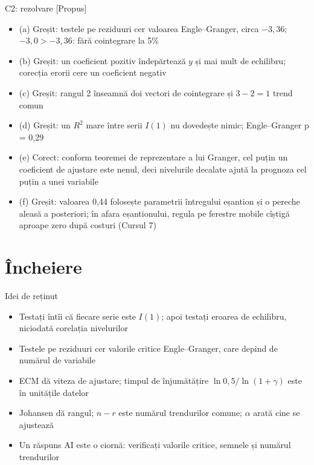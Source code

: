 \ifsolutions
\begin{frame}{C2: rezolvare [Propus]}
\itemsize{\scriptsize}
\begin{itemize}
    \item (a) Greșit: testele pe reziduuri cer valoarea Engle--Granger, circa $-3{,}36$; $-3{,}0 > -3{,}36$: fără cointegrare la 5\%
    \item (b) Greșit: un coeficient pozitiv îndepărtează $y$ și mai mult de echilibru; corecția erorii cere un coeficient negativ
    \item (c) Greșit: rangul 2 înseamnă doi vectori de cointegrare și $3 - 2 = 1$ trend comun
    \item (d) Greșit: un $R^2$ mare între serii $I(1)$ nu dovedește nimic; Engle--Granger p = 0{,}29
    \item (e) Corect: conform teoremei de reprezentare a lui Granger, cel puțin un coeficient de ajustare este nenul, deci nivelurile decalate ajută la prognoza cel puțin a unei variabile
    \item (f) Greșit: valoarea 0,44 folosește parametrii întregului eșantion și o pereche aleasă a posteriori; în afara eșantionului, regula pe ferestre mobile cîștigă aproape zero după costuri (Cursul 7)
\end{itemize}
\end{frame}
\fi


\section{Încheiere}

\begin{frame}{Idei de reținut}
\itemsize{\small}
\begin{itemize}
    \item Testați întîi că fiecare serie este $I(1)$; apoi testați eroarea de echilibru, niciodată corelația nivelurilor
    \item Testele pe reziduuri cer valorile critice Engle--Granger, care depind de numărul de variabile
    \item ECM dă viteza de ajustare; timpul de înjumătățire $\ln 0{,}5/\ln(1 + \gamma)$ este în unitățile datelor
    \item Johansen dă rangul; $n - r$ este numărul trendurilor comune; $\alpha$ arată cine se ajustează
    \item Un răspuns AI este o ciornă: verificați valorile critice, semnele și numărul trendurilor
\end{itemize}
\end{frame}

